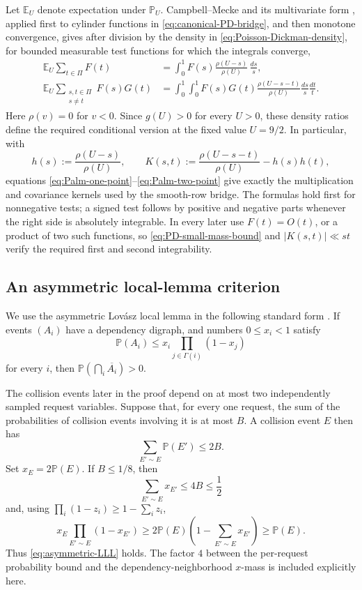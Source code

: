 \documentclass[11pt]{article}
\numberwithin{equation}{section}
\theoremstyle{definition}
\theoremstyle{remark}
\newcommand{\1}{\mathbf 1}
\begin{document}
Let \(\mathbb E_U\) denote expectation under \(\mathbb P_U\).
Campbell--Mecke and its multivariate form
\cite[Theorems~4.1 and~4.4]{LastPenrose2017}, applied first to cylinder functions in
\eqref{eq:canonical-PD-bridge}, and then monotone convergence, gives after
division by the density in \eqref{eq:Poisson-Dickman-density}, for bounded
measurable test functions for which the integrals converge,
\begin{align}
 \mathbb E_U\sum_{t\in\Pi}F(t)
 &=\int_0^1 F(s)
     \frac{\rho(U-s)}{\rho(U)}\,\frac{ds}{s},
 \label{eq:Palm-one-point}\\
 \mathbb E_U\sum_{\substack{s,t\in\Pi\\s\ne t}}F(s)G(t)
 &=\int_0^1\!\int_0^1 F(s)G(t)
     \frac{\rho(U-s-t)}{\rho(U)}
                  \frac{ds}{s}\frac{dt}{t}.
 \label{eq:Palm-two-point}
\end{align}
Here \(\rho(v)=0\) for \(v<0\).  Since \(g(U)>0\) for every \(U>0\),
these density ratios define the required conditional version at the fixed
value \(U=9/2\).  In particular, with
\[
 h(s):=\frac{\rho(U-s)}{\rho(U)},
 \qquad K(s,t):=\frac{\rho(U-s-t)}{\rho(U)}-h(s)h(t),
\]
equations \eqref{eq:Palm-one-point}--\eqref{eq:Palm-two-point} give exactly
the multiplication and covariance kernels used by the smooth-row bridge.
The formulas hold first for nonnegative tests; a signed test follows by
positive and negative parts whenever the right side is absolutely
integrable.  In every later use \(F(t)=O(t)\), or a product of two such
functions, so \eqref{eq:PD-small-mass-bound} and
\(|K(s,t)|\ll st\) verify the required first and second integrability.

\subsection{An asymmetric local-lemma criterion}
\label{subsec:LLL}

We use the asymmetric Lov\'asz local lemma in the following standard form
\cite[Lemma~5.1.1]{AlonSpencer2016}.  If events \((A_i)\) have a dependency
digraph, and numbers \(0\leq x_i<1\) satisfy
\begin{equation}
 \label{eq:asymmetric-LLL}
 \mathbb P(A_i)\leq x_i
       \prod_{j\in\Gamma(i)}(1-x_j)
\end{equation}
for every \(i\), then
\(\mathbb P(\bigcap_i\overline{A_i})>0\).

The collision events later in the proof depend on at most two independently
sampled request variables.  Suppose that, for every one request, the sum of
the probabilities of collision events involving it is at most \(B\).  A
collision event \(E\) then has
\[
       \sum_{E'\sim E}\mathbb P(E')\leq2B.
\]
Set \(x_E=2\mathbb P(E)\).  If \(B\leq1/8\), then
\[
       \sum_{E'\sim E}x_{E'}\leq4B\leq\frac12
\]
and, using \(\prod_i(1-z_i)\geq1-\sum_i z_i\),
\[
 x_E\prod_{E'\sim E}(1-x_{E'})
 \geq2\mathbb P(E)
       \left(1-\sum_{E'\sim E}x_{E'}\right)
 \geq\mathbb P(E).
\]
Thus \eqref{eq:asymmetric-LLL} holds.  The factor \(4\) between the
per-request probability bound and the dependency-neighborhood \(x\)-mass is
included explicitly here.
\end{document}

